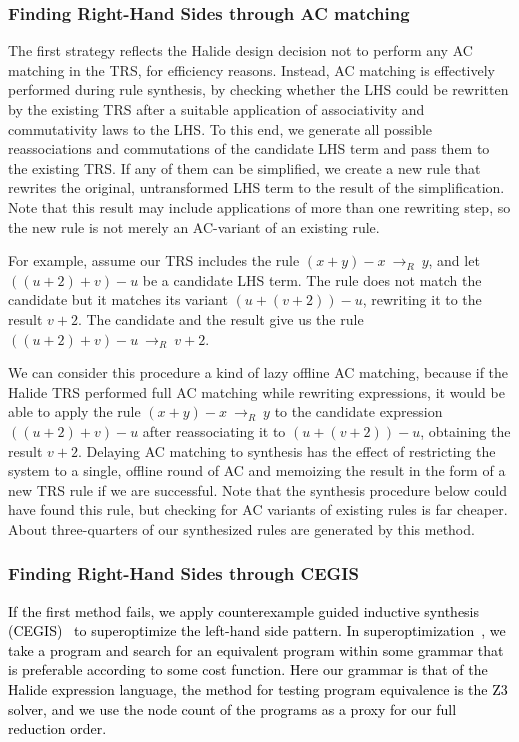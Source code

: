 \documentclass[acmsmall]{acmart}\settopmatter{}
\newcommand{\modified}[1]{\textcolor{black}{{#1}}}
\newcommand{\rewrites}[0]{\:\rightarrow_{R}\:}
\begin{document}
\subsubsection{Finding Right-Hand Sides through AC matching}
\label{sec:rhsacmatching}
The first strategy reflects the Halide design decision not to perform any AC matching in the TRS, for efficiency reasons. 
Instead, AC matching is effectively performed during rule synthesis, by checking whether the LHS could be 
rewritten by the existing TRS after a suitable application of associativity and commutativity laws to the LHS. 
To this end, we generate all possible reassociations and commutations of the candidate LHS term and pass them to the existing TRS. 
If any of them can be simplified, we create a new rule that rewrites 
the original, untransformed LHS term to the result of the simplification.  Note that this result may include applications of more than one rewriting step, so the new rule is not merely an AC-variant of an existing rule.

For example, assume our TRS includes the rule $(x + y) - x \rewrites y$, 
and let $((u + 2) + v) - u$ be a candidate LHS term. The rule does not match the candidate but it matches its variant $(u + (v + 2)) - u$, rewriting it to the result $v + 2$. The candidate and the result give us the rule $((u + 2) + v) - u \rewrites v + 2$.

We can consider this procedure a kind of lazy offline AC matching, because if the Halide TRS 
performed full AC matching while rewriting expressions, it would be able to apply the rule $(x + y) - x \rewrites  y$ to the candidate expression $((u + 2) + v) - u$ after reassociating it to $(u + (v + 2)) - u$, obtaining the result $v + 2$.  Delaying AC matching to synthesis has the effect of restricting the system to a single, offline round of AC and memoizing the result in the form of a new TRS rule if we are successful. 
Note that the synthesis procedure below could have found this rule, but checking for AC
variants of existing rules is far cheaper. About three-quarters of our synthesized rules are generated by this method.

\subsubsection{Finding Right-Hand Sides through CEGIS}
\label{sec:rhssynthesis}
\modified{If the first method fails, we apply counterexample guided inductive synthesis (CEGIS)~\cite{DBLP:conf/aplas/Solar-Lezama09} to superoptimize the left-hand side pattern.
In superoptimization~\cite{massalin1987superoptimizer}, we take a program and search 
for an equivalent program within some grammar that is preferable according 
to some cost function. Here our grammar is that of the Halide expression language, 
the method for testing program equivalence is the Z3 solver, and we use the node
count of the programs as a proxy for our full reduction order.}
\end{document}
